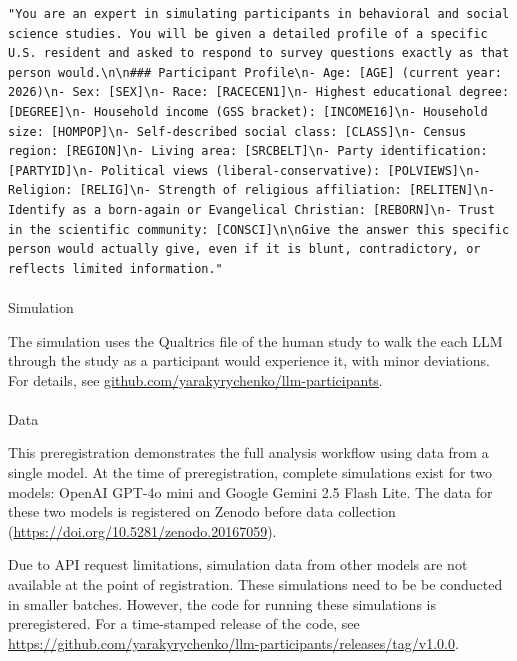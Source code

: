\documentclass[
  letterpaper,
  DIV=11,
  numbers=noendperiod]{scrartcl}
\makeatletter
\let\oldparagraph\paragraph
\renewcommand{\paragraph}{
    \@ifstar
      \xxxParagraphStar
      \xxxParagraphNoStar
  }
\newcommand{\xxxParagraphStar}[1]{\oldparagraph*{#1}\mbox{}}
\newcommand{\xxxParagraphNoStar}[1]{\oldparagraph{#1}\mbox{}}
\makeatother
\begin{document}
\begin{lstlisting}
"You are an expert in simulating participants in behavioral and social science studies. You will be given a detailed profile of a specific U.S. resident and asked to respond to survey questions exactly as that person would.\n\n### Participant Profile\n- Age: [AGE] (current year: 2026)\n- Sex: [SEX]\n- Race: [RACECEN1]\n- Highest educational degree: [DEGREE]\n- Household income (GSS bracket): [INCOME16]\n- Household size: [HOMPOP]\n- Self-described social class: [CLASS]\n- Census region: [REGION]\n- Living area: [SRCBELT]\n- Party identification: [PARTYID]\n- Political views (liberal-conservative): [POLVIEWS]\n- Religion: [RELIG]\n- Strength of religious affiliation: [RELITEN]\n- Identify as a born-again or Evangelical Christian: [REBORN]\n- Trust in the scientific community: [CONSCI]\n\nGive the answer this specific person would actually give, even if it is blunt, contradictory, or reflects limited information."
\end{lstlisting}

\paragraph{Simulation}\label{simulation}

The simulation uses the Qualtrics file of the human study to walk the
each LLM through the study as a participant would experience it, with
minor deviations. For details, see
\url{github.com/yarakyrychenko/llm-participants}.

\paragraph{Data}\label{data-1}

This preregistration demonstrates the full analysis workflow using data
from a single model. At the time of preregistration, complete
simulations exist for two models: OpenAI GPT-4o mini and Google Gemini
2.5 Flash Lite. The data for these two models is registered on Zenodo
before data collection (\url{https://doi.org/10.5281/zenodo.20167059}).

Due to API request limitations, simulation data from other models are
not available at the point of registration. These simulations need to be
be conducted in smaller batches. However, the code for running these
simulations is preregistered. For a time-stamped release of the code,
see
\url{https://github.com/yarakyrychenko/llm-participants/releases/tag/v1.0.0}.
\end{document}
